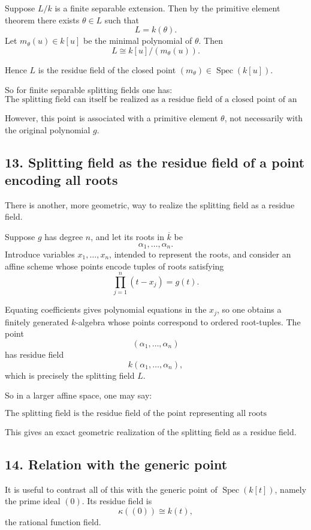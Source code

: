 \documentclass[12pt,a4paper]{article}
\theoremstyle{plain}
\theoremstyle{definition}      %
\begin{document}
Suppose \(L/k\) is a finite separable extension. Then by the primitive element theorem there exists \(\theta\in L\) such that
\[
L=k(\theta).
\]
Let \(m_\theta(u)\in k[u]\) be the minimal polynomial of \(\theta\). Then
\[
L\cong k[u]/(m_\theta(u)).
\]

Hence \(L\) is the residue field of the closed point \((m_\theta)\in \operatorname{Spec}(k[u])\).

So for finite separable splitting fields one has:
\[
\boxed{\text{The splitting field can itself be realized as a residue field of a closed point of an affine line.}}
\]

However, this point is associated with a primitive element \(\theta\), not necessarily with the original polynomial \(g\).

\subsection*{13. Splitting field as the residue field of a point encoding all roots}

There is another, more geometric, way to realize the splitting field as a residue field.

Suppose \(g\) has degree \(n\), and let its roots in \(\overline{k}\) be
\[
\alpha_1,\dots,\alpha_n.
\]
Introduce variables \(x_1,\dots,x_n\), intended to represent the roots, and consider an affine scheme whose points encode tuples of roots satisfying
\[
\prod_{j=1}^n (t-x_j)=g(t).
\]

Equating coefficients gives polynomial equations in the \(x_j\), so one obtains a finitely generated \(k\)-algebra whose points correspond to ordered root-tuples. The point
\[
(\alpha_1,\dots,\alpha_n)
\]
has residue field
\[
k(\alpha_1,\dots,\alpha_n),
\]
which is precisely the splitting field \(L\).

So in a larger affine space, one may say:

\[
\boxed{\text{The splitting field is the residue field of the point representing all roots simultaneously.}}
\]

This gives an exact geometric realization of the splitting field as a residue field.

\subsection*{14. Relation with the generic point}

It is useful to contrast all of this with the generic point of \(\operatorname{Spec}(k[t])\), namely the prime ideal \((0)\). Its residue field is
\[
\kappa((0))\cong k(t),
\]
the rational function field.
\end{document}
